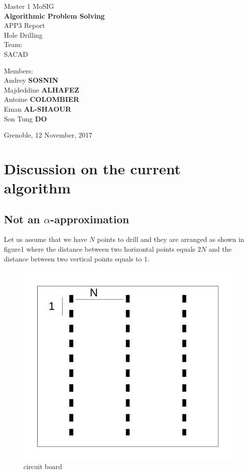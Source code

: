 \documentclass{article}
\begin{document}
\begin{titlepage}
\begin{center}

\vspace*{10cm}
{\large Master 1 MoSIG}\\[0.5cm]

{\Huge \textbf{Algorithmic Problem Solving} }\\[0.5cm]
{\large APP3 Report}\\
Hole Drilling\\ 
Team:\\SACAD
\vfill

\noindent
\begin{minipage}{0.4\textwidth}
   \centering Members:\\
   Andrey \textbf{SOSNIN}\\
   Majdeddine \textbf{ALHAFEZ}\\
   Antoine \textbf{COLOMBIER}\\
   Eman \textbf{AL-SHAOUR}\\
   Son Tung \textbf{DO}\\
\end{minipage}%

\vfill
{Grenoble, 12 November, 2017}
\end{center}
\end{titlepage}
\clearpage

\section{Discussion on the current algorithm}


\subsection{Not an $\alpha$-approximation}
Let us assume that we have $N$ points to drill and they are arranged as shown in figure1 where the distance between two horizontal points equals $2N$ and the distance between two vertical points equals to $1$.

\begin{figure}[h]
\includegraphics[width=0.3\linewidth]{F0.jpg}
\caption{circuit board}
\end{figure}
\end{document}
